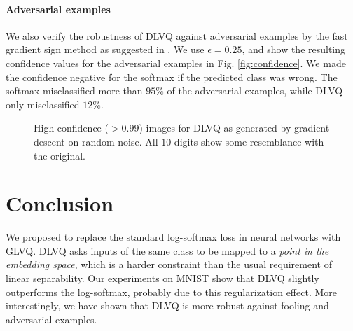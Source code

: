 \documentclass{esannV2}
\begin{document}
\paragraph{Adversarial examples}
We also verify the robustness of DLVQ against adversarial examples by the fast gradient sign method as suggested in \cite{DBLP:journals/corr/GoodfellowSS14}. We use $\epsilon=0.25$, and show the resulting confidence values for the adversarial examples in Fig. \ref{fig:confidence}. We made the confidence negative for the softmax if the predicted class was wrong. The softmax misclassified more than $95\%$ of the adversarial examples, while DLVQ only misclassified $12\%$. 


\begin{figure}[t]
\caption{High confidence ($>0.99$) images for DLVQ as generated by gradient descent on random noise. All $10$ digits show some resemblance with the original. }
\label{fig:fooling}
\end{figure}

\section{Conclusion}
We proposed to replace the standard log-softmax loss in neural networks with GLVQ. DLVQ asks inputs of the same class to be mapped to a \emph{point in the embedding space}, which is a harder constraint than the usual requirement of linear separability. Our experiments on MNIST show that DLVQ slightly outperforms the log-softmax, probably due to this regularization effect. More interestingly, we have shown that DLVQ is more robust against fooling and adversarial examples. 
\end{document}
